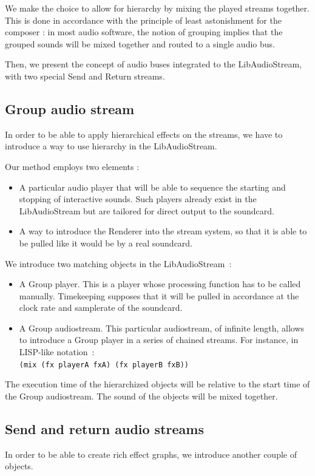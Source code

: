\documentclass{article}
\begin{document}
We make the choice to allow for hierarchy by mixing the played streams together.
This is done in accordance with the principle of least astonishment\cite{seebach2001cranky} for the composer : 
in most audio software, the notion of grouping implies that the grouped sounds will be mixed 
together and routed to a single audio bus.

Then, we present the concept of audio buses integrated to the LibAudioStream,
with two special Send and Return streams.

\subsection{Group audio stream}
In order to be able to apply hierarchical effects on the streams, 
we have to introduce a way to use hierarchy in the LibAudioStream.

Our method employs two elements : 
\begin{itemize}
	\item A particular audio player that will be able to sequence the starting and stopping 
	of interactive sounds.
	Such players already exist in the LibAudioStream but are tailored for direct output to
	the soundcard.
	\item A way to introduce the Renderer into the stream system, so that it 
	is able to be pulled like it would be by a real soundcard.
\end{itemize}

We introduce two matching objects in the LibAudioStream~: 
\begin{itemize}
	\item A Group player. This is a player whose processing function has to be called manually. 
	Timekeeping supposes that it will be pulled in accordance at the clock rate
	and samplerate of the soundcard.
	\item A Group audiostream. This particular audiostream, of infinite length, 
	allows to introduce a Group player in a series of chained streams.
	For instance, in LISP-like notation~:~\\\lstinline[language=LISP]{(mix (fx playerA fxA) (fx playerB fxB))}
\end{itemize}

The execution time of the hierarchized objects will be relative to the start time of the Group audiostream.
The sound of the objects will be mixed together.

\subsection{Send and return audio streams}
In order to be able to create rich effect graphs, we introduce another couple of objects.
\end{document}
